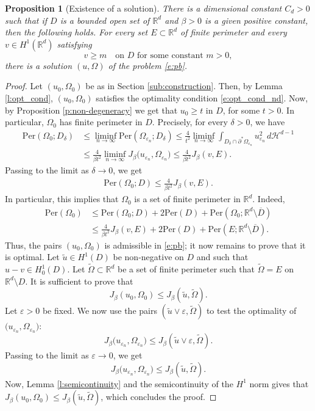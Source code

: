\documentclass[JEP,XML,SOM,Unicode]{cedram}
\newcommand{\Per}{\mathrm{Per}}
\theoremstyle{plain}
\newtheorem{prop}[teo]{Proposition}
\theoremstyle{definition}
\let\eps\varepsilon
\def\R{\mathbb{R}}
\def\HH{\mathcal{H}}
\begin{document}
\begin{prop}[Existence of a solution]
There is a dimensional constant $C_d>0$ such that if $D$ is a bounded open set of $\R^d$ and $\beta>0$ is a given positive constant, then the following holds. For every set $E\subset\R^d$ of finite perimeter and every $v\in H^1(\R^d)$ satisfying
\[v\ge m\quad\text{on } D\text{ for some constant } m>0,\]
there is a solution $(u,\Omega)$ of the problem \eqref{e:pb}.
\end{prop}
\begin{proof}
Let $(u_0,\Omega_0)$ be as in Section \ref{sub:construction}. Then, by Lemma \ref{l:opt_cond}, $(u_0,\Omega_0)$ satisfies the optimality condition \eqref{e:opt_cond_nd}. Now, by Proposition \ref{p:non-degeneracy} we get that $u_0\ge t$ in $D$, for some $t>0$. In particular, $\Omega_0$ has finite perimeter in $D$. Precisely, for every $\delta>0$, we have
\begin{align*}
\Per(\Omega_0;D_\delta)&\le \liminf_{n\to\infty}\Per(\Omega_{\eps_n};D_\delta)\le \frac4{t^2}\liminf_{n\to\infty}\int_{D_\delta\cap\partial^\ast\Omega_{\eps_n}}u_{\eps_n}^2\,d\HH^{d-1}\\
&\le \frac4{\beta t^2}\liminf_{n\to\infty}J_\beta\big(u_{\eps_n},\Omega_{\eps_n}\big)\le \frac4{\beta t^2} J_\beta(v,E).
\end{align*}
Passing to the limit as $\delta\to0$, we get
\begin{align*}
\Per(\Omega_0;D)\le \frac4{\beta t^2} J_\beta(v,E).
\end{align*}
In particular, this implies that $\Omega_0$ is a set of finite perimeter in $\R^d$. Indeed,
\begin{align*}
\Per(\Omega_0)&\le \Per(\Omega_0;D)+2\Per(D)+\Per(\Omega_0;\R^d\setminus \overline D)\\
&\le \frac4{\beta t^2} J_\beta(v,E)+2\Per(D)+\Per(E;\R^d\setminus \overline D).
\end{align*}
Thus, the pairs $(u_0,\Omega_0)$ is admissible in \eqref{e:pb}; it now remains to prove that it is optimal. Let $\widetilde u\in H^1(D)$ be non-negative on $D$ and such that $u-v\in H^1_0(D)$. Let $\widetilde \Omega\subset\R^d$ be a set of finite perimeter such that $\widetilde \Omega=E$ on $\R^d\setminus D$. It is sufficient to prove that
\[J_\beta(u_0,\Omega_0)\le J_\beta(\widetilde u,\widetilde\Omega).\]
Let $\eps>0$ be fixed. We now use the pairs $(\widetilde u\vee \eps,\widetilde\Omega)$ to test the optimality of $\big(u_{\eps_n},\Omega_{\eps_n}\big)$:
\[J_\beta\big(u_{\eps_n},\Omega_{\eps_n}\big)\le J_\beta(\widetilde u\vee \eps,\widetilde\Omega).\]
Passing to the limit as $\eps\to0$, we get
\[J_\beta\big(u_{\eps_n},\Omega_{\eps_n}\big)\le J_\beta(\widetilde u,\widetilde\Omega).\]
Now, Lemma \ref{l:semicontinuity} and the semicontinuity of the $H^1$ norm gives that $J_\beta (u_0,\Omega_{0})\le J_\beta(\widetilde u,\widetilde\Omega)$,
which concludes the proof.
\end{proof}
\end{document}
